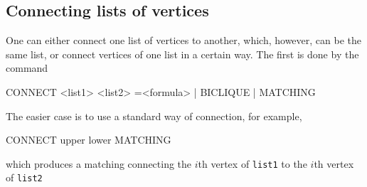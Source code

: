 \subsection{Connecting lists of vertices}

One can either connect one list of vertices to another, which, however, can be the same list, or connect vertices of one list in a certain way. The first is done by the command
\\\begin{tcolorbox}[colback=lightpink]
  CONNECT <list1> <list2> =<formula> | BICLIQUE | MATCHING
\end{tcolorbox}

The easier case is to use a standard way of connection, for example,
\\\begin{tcolorbox}[colback=palegreen]
  CONNECT upper lower MATCHING
\end{tcolorbox}
which produces a matching connecting the $i$th vertex of
\texttt{list1} to the $i$th vertex of \texttt{list2}



